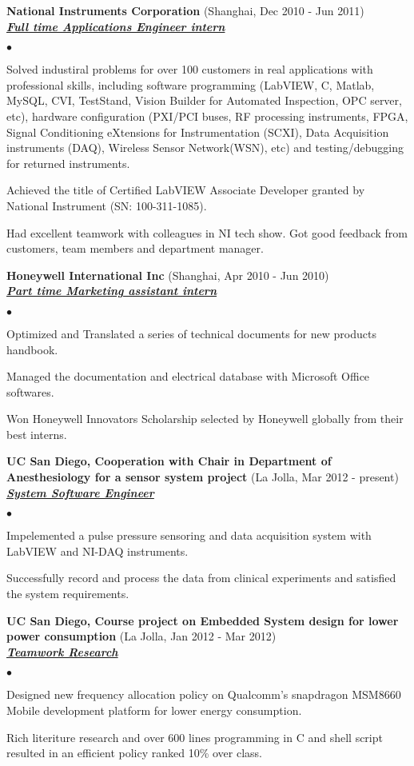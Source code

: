 \documentclass{article}
\newcommand{\employer}[3]{{ \textbf{#1} (#2)\\ \underline{\textbf{\emph{#3}}}\\  }}
\newenvironment{achievements}{\begin{list}{$\bullet$}{\topsep 0pt \itemsep -2pt}}{\vspace*{4pt}\end{list}}
\begin{document}
\employer{National Instruments Corporation}{Shanghai, Dec 2010 - Jun 2011}{Full time Applications Engineer intern}
	\begin{achievements}
	\item Solved industiral problems for over 100 customers in real applications with professional skills, including software
	      programming (LabVIEW, C, Matlab, MySQL, CVI, TestStand, Vision Builder for Automated Inspection, OPC server, etc), hardware
	      configuration (PXI/PCI buses, RF processing instruments, FPGA, Signal Conditioning eXtensions for Instrumentation
	      (SCXI), Data Acquisition instruments (DAQ), Wireless Sensor Network(WSN), etc) and testing/debugging for returned instruments. 
	\item Achieved the title of Certified LabVIEW Associate Developer granted by National Instrument (SN: 100-311-1085).
	\item Had excellent teamwork with colleagues in NI tech show. Got good feedback from customers, team members and department manager.
	\end{achievements}

\employer{Honeywell International Inc}{Shanghai, Apr 2010 - Jun 2010} {Part time Marketing assistant intern}
	\begin{achievements}
	\item Optimized and Translated a series of technical documents for new products handbook.
	\item Managed the documentation and electrical database with Microsoft Office softwares.
	\item Won Honeywell Innovators Scholarship selected by Honeywell globally from their best interns. 
	\end{achievements}

\employer{UC San Diego, Cooperation with Chair in Department of Anesthesiology for a sensor system project}{La Jolla, Mar 2012 - present}{System Software Engineer}
	\begin{achievements}
	\item Impelemented a pulse pressure sensoring and data acquisition system with LabVIEW and NI-DAQ instruments.
	\item Successfully record and process the data from clinical experiments and satisfied the system requirements.
	\end{achievements}

\employer{UC San Diego, Course project on Embedded System design for lower power consumption}{La Jolla, Jan 2012 - Mar 2012}{Teamwork Research}
	\begin{achievements}
	\item Designed new frequency allocation policy on Qualcomm’s snapdragon MSM8660 Mobile development platform for lower energy consumption. 
	\item Rich literiture research and over 600 lines programming in C and shell script resulted in an efficient policy ranked 10\% over class.
	\end{achievements}
\end{document}
